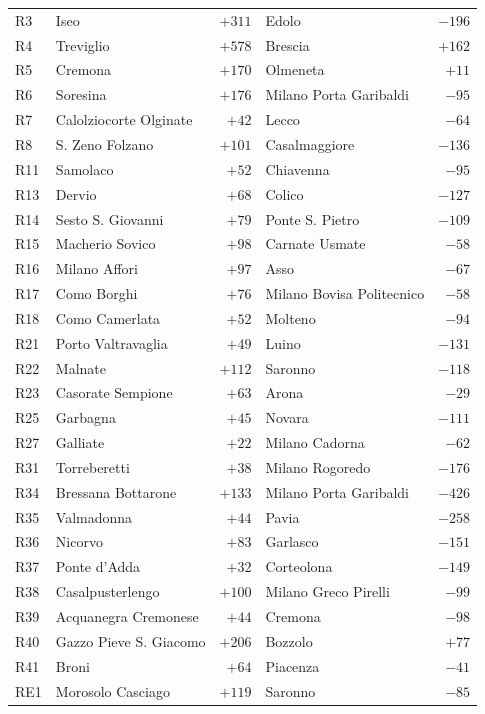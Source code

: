 {\begin{longtable}{@{}l>{\raggedright\arraybackslash}p{}r>{\raggedright\arraybackslash}p{}r@{}}
	R3 & Iseo & $+311$ & Edolo & $-196$ \\
	R4 & Treviglio & $+578$ & Brescia & $+162$ \\
	R5 & Cremona & $+170$ & Olmeneta & $+11$ \\
	R6 & Soresina & $+176$ & Milano Porta Garibaldi & $-95$ \\
	R7 & Calolziocorte Olginate & $+42$ & Lecco & $-64$ \\
	R8 & S. Zeno Folzano & $+101$ & Casalmaggiore & $-136$ \\
	R11 & Samolaco & $+52$ & Chiavenna & $-95$ \\
	R13 & Dervio & $+68$ & Colico & $-127$ \\
	R14 & Sesto S. Giovanni & $+79$ & Ponte S. Pietro & $-109$ \\
	R15 & Macherio Sovico & $+98$ & Carnate Usmate & $-58$ \\
	R16 & Milano Affori & $+97$ & Asso & $-67$ \\
	R17 & Como Borghi & $+76$ & Milano Bovisa Politecnico & $-58$ \\
	R18 & Como Camerlata & $+52$ & Molteno & $-94$ \\
	R21 & Porto Valtravaglia & $+49$ & Luino & $-131$ \\
	R22 & Malnate & $+112$ & Saronno & $-118$ \\
	R23 & Casorate Sempione & $+63$ & Arona & $-29$ \\
	R25 & Garbagna & $+45$ & Novara & $-111$ \\
	R27 & Galliate & $+22$ & Milano Cadorna & $-62$ \\
	R31 & Torreberetti & $+38$ & Milano Rogoredo & $-176$ \\
	R34 & Bressana Bottarone & $+133$ & Milano Porta Garibaldi & $-426$ \\
	R35 & Valmadonna & $+44$ & Pavia & $-258$ \\
	R36 & Nicorvo & $+83$ & Garlasco & $-151$ \\
	R37 & Ponte d'Adda & $+32$ & Corteolona & $-149$ \\
	R38 & Casalpusterlengo & $+100$ & Milano Greco Pirelli & $-99$ \\
	R39 & Acquanegra Cremonese & $+44$ & Cremona & $-98$ \\
	R40 & Gazzo Pieve S. Giacomo & $+206$ & Bozzolo & $+77$ \\
	R41 & Broni & $+64$ & Piacenza & $-41$ \\
	RE1 & Morosolo Casciago & $+119$ & Saronno & $-85$ \\

\end{longtable}}
